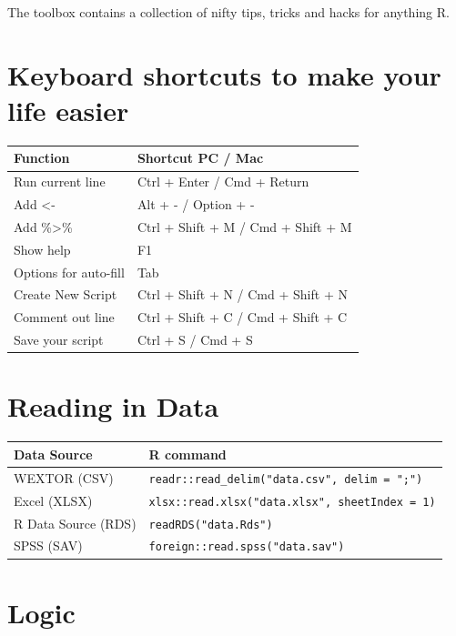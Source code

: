 \documentclass[
]{book}
\begin{document}
The toolbox contains a collection of nifty tips, tricks and hacks for anything R.

\section*{Keyboard shortcuts to make your life easier}\label{shortcuts}

\begin{longtable}[]{@{}ll@{}}
\toprule\noalign{}
Function & Shortcut PC / Mac \\
\midrule\noalign{}
\endhead
\bottomrule\noalign{}
\endlastfoot
Run current line & Ctrl + Enter / Cmd + Return \\
Add \textless- & Alt + - / Option + - \\
Add \%\textgreater\% & Ctrl + Shift + M / Cmd + Shift + M \\
Show help & F1 \\
Options for auto-fill & Tab \\
Create New Script & Ctrl + Shift + N / Cmd + Shift + N \\
Comment out line & Ctrl + Shift + C / Cmd + Shift + C \\
Save your script & Ctrl + S / Cmd + S \\
\end{longtable}

\section*{Reading in Data}\label{reading-in-data}

\begin{longtable}[]{@{}ll@{}}
\toprule\noalign{}
Data Source & R command \\
\midrule\noalign{}
\endhead
\bottomrule\noalign{}
\endlastfoot
WEXTOR (CSV) & \texttt{readr::read\_delim("data.csv",\ delim\ =\ ";")} \\
Excel (XLSX) & \texttt{xlsx::read.xlsx("data.xlsx",\ sheetIndex\ =\ 1)} \\
R Data Source (RDS) & \texttt{readRDS("data.Rds")} \\
SPSS (SAV) & \texttt{foreign::read.spss("data.sav")} \\
\end{longtable}

\section*{Logic}\label{logic-1}
\end{document}
